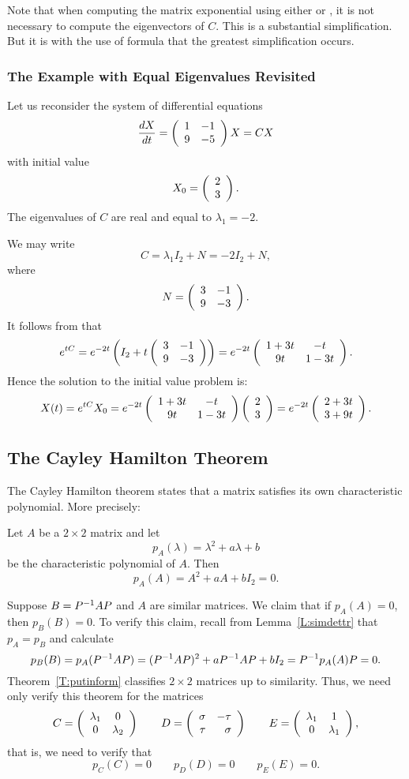 Note that when computing the matrix exponential using either 
or , it is not necessary to compute the eigenvectors of $C$.
This is a substantial simplification.  But it is with the use of formula
 that the greatest simplification occurs.

\subsubsection*{The Example with Equal Eigenvalues Revisited}

Let us reconsider the system of differential equations 
\[
\frac{dX}{dt} = \left(\begin{array}{rr} 1 & -1\\ 9 &-5\end{array}\right) X = CX
\]
with initial value
\[
X_0 = \left(\begin{array}{r} 2 \\ 3\end{array}\right).
\]
The eigenvalues of $C$ are real and equal to $\lambda_1=-2$.

We may write
\[
C = \lambda_1 I_2 + N = -2I_2+N,
\]
where
\[
N = \left(\begin{array}{rr} 3 & -1\\ 9 &-3\end{array}\right).
\]
It follows from  that
\begin{equation}  \label{e:solntob}
e^{tC} =  e^{-2t}\left(I_2+t\left(\begin{array}{rr} 3 & -1\\ 9 &-3\end{array}\right)\right)
= e^{-2t}\left(\begin{array}{cc} 1+3t & -t\\ 9t &1-3t\end{array}\right).
\end{equation}
Hence the solution to the initial value problem is:
\[
X(t) = e^{tC}X_0 = e^{-2t}\left(\begin{array}{cc} 1+3t & -t\\ 9t &1-3t\end{array}\right)\left(\begin{array}{r} 2 \\ 3\end{array}\right)
 = e^{-2t}\left(\begin{array}{r} 2+3t \\ 3+9t\end{array}\right).
\]

\subsection*{The Cayley Hamilton Theorem} 

The Cayley Hamilton theorem states that a matrix satisfies its own
characteristic polynomial.  More precisely:
\begin{thm} \label{T:CH2}
Let $A$ be a $2\times 2$ matrix and let
\[
p_A(\lambda) = \lambda^2 + a\lambda + b
\]
be the characteristic polynomial of $A$.  Then
\[
p_A(A) = A^2 + aA + bI_2 = 0.
\]
\end{thm}

\proof  Suppose $B=P^{-1} AP$ and $A$ are similar matrices.  We claim that
if $p_A(A)=0$, then $p_B(B)=0$.  To verify this claim, recall from
Lemma~\ref{L:simdettr} that $p_A=p_B$ and calculate
\[
p_B(B) = p_A(P^{-1} AP) = (P^{-1} AP)^2 + aP^{-1} AP + bI_2 = P^{-1} p_A(A)P= 0.
\]
Theorem~\ref{T:putinform} classifies $2\times 2$ matrices up to similarity.
Thus, we need only verify this theorem for the matrices
\[
C =  \left(\begin{array}{cc} \lambda_1 & 0\\ 0 &\lambda_2\end{array}\right) \qquad
D =  \left(\begin{array}{rr} \sigma & -\tau\\ \tau &\sigma\end{array}\right) \qquad
E =  \left(\begin{array}{cc} \lambda_1 & 1\\ 0 &\lambda_1\end{array}\right),
\]
that is, we need to verify that
\[
p_C(C) = 0 \qquad p_D(D)=0 \qquad p_E(E)=0.
\]

